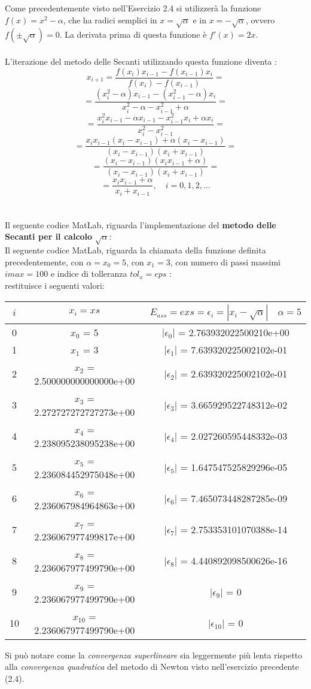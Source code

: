 Come precedentemente visto nell'Esercizio 2.4 si utilizzerà la funzione $f(x) = x^2-\alpha$, che ha radici semplici in $x=\sqrt{\alpha}$ e in $x=-\sqrt{\alpha}$, ovvero $f(\pm\sqrt{\alpha})=0$. La derivata prima di questa funzione è $f'(x)=2x$.\\\\
L'iterazione del metodo delle Secanti utilizzando questa funzione diventa :
	\[
	x_{i+1} = \frac{f(x_i)x_{i-1}-f(x_{i-1})x_i}{f(x_i)-f(x_{i-1})} =
	\]
	\[
	= \frac{(x_i^2-\alpha)x_{i-1}-(x_{i-1}^2-\alpha)x_i}{x_i^2-\alpha-x_{i-1}^2+\alpha}  =
	\]
	\[
	= \frac{x_i^2x_{i-1}-\alpha x_{i-1}-x_{i-1}^2x_i+\alpha x_i}{x_i^2-x_{i-1}^2} =
	\]
	\[
	= \frac{x_ix_{i-1}(x_i-x_{i-1})+\alpha (x_i-x_{i-1})}{(x_i-x_{i-1})(x_i+x_{i-1})} =
	\]
	\[
	= \frac{(x_i-x_{i-1})(x_ix_{i-1}+\alpha)}{(x_i-x_{i-1})(x_i+x_{i-1})} =
	\]
	\[
	= \frac{x_ix_{i-1}+\alpha}{x_i+x_{i-1}},\quad i=0,1,2,...
	\]\\\\
Il seguente codice MatLab, riguarda l'implementazione del \textbf{metodo delle Secanti per il calcolo} $\sqrt{\alpha}$:\\ 
	
Il seguente codice MatLab, riguarda la chiamata della funzione definita precedentemente, con $\alpha=x_0=5$, con $x_1=3$, con numero di passi massimi $imax=100$ e indice di tolleranza $tol_x=eps$ :\\
	
restituisce i seguenti valori:\\
\begin{center}
	\begin{tabular}{|c|c|c|}
		\hline
			$i$ & $x_i=xs$ & $E_{ass}=exs=\epsilon_i=|x_i-\sqrt{\alpha}| \quad \alpha=5$ \\
		\hline
    		0 & $x_0$ = 5 & $|\epsilon_0|$ = 2.763932022500210e+00\\
    		1 & $x_1$ = 3 & $|\epsilon_1|$ = 7.639320225002102e-01\\
    		2 & $x_2$ = 2.500000000000000e+00 & $|\epsilon_2|$ = 2.639320225002102e-01\\
    		3 & $x_3$ = 2.272727272727273e+00 & $|\epsilon_3|$ = 3.665929522748312e-02\\
    		4 & $x_4$ = 2.238095238095238e+00 & $|\epsilon_4|$ = 2.027260595448332e-03\\
    		5 & $x_5$ = 2.236084452975048e+00 & $|\epsilon_5|$ = 1.647547525829296e-05\\
    		6 & $x_6$ = 2.236067984964863e+00 & $|\epsilon_6|$ = 7.465073448287285e-09\\
    		7 & $x_7$ = 2.236067977499817e+00 & $|\epsilon_7|$ = 2.753353101070388e-14\\
    		8 & $x_8$ = 2.236067977499790e+00 & $|\epsilon_8|$ = 4.440892098500626e-16\\
    		9 & $x_9$ = 2.236067977499790e+00 & $|\epsilon_9|$ = 0\\
    		10 & $x_{10}$ = 2.236067977499790e+00 & $|\epsilon_{10}|$ = 0\\
		\hline
	\end{tabular}
\end{center}
Si può notare come la \textit{convergenza superlineare} sia leggermente più lenta rispetto alla \textit{convergenza quadratica} del metodo di Newton visto nell'esercizio precedente (2.4).